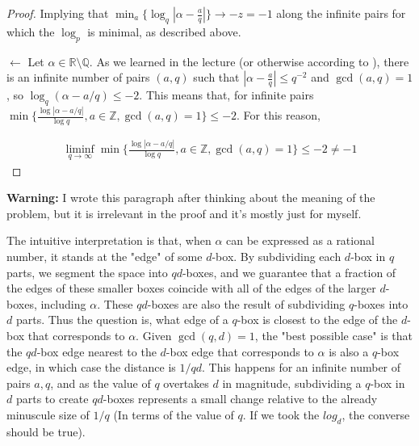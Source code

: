 \documentclass{article}
\newcommand{\R}{\mathbb{R}}
\newcommand{\Q}{\mathbb{Q}}
\newcommand{\Z}{\mathbb{Z}}
\newcommand{\abs}[1]{\left| #1 \right|}
\begin{document}
\begin{proof}
Implying that $\min_a\{ \log_q\abs{\alpha - \frac{a}{q}} \} \rightarrow -z = -1$ along the infinite pairs for which the $\log_p$ is minimal, as described above.

$\leftarrow$ Let $\alpha \in \R \setminus \Q$. As we learned in the lecture (or otherwise according to \cite[\nopp Corollary 1.2]{Everste1}), there is an infinite number of pairs $(a, q)$ such that $\abs{\alpha - \frac{a}{q}} \leq q^{-2}$ and $\gcd(a, q) = 1$, so $\log_q(\alpha - a/q) \leq -2$. This means that, for infinite pairs $\min\{\frac{\log\abs{\alpha - a/q}}{\log q}, a \in \Z, \gcd(a, q) = 1 \} \leq -2$. For this reason, 

\begin{align*}
  \liminf_{q \to \infty}\min\{\frac{\log\abs{\alpha - a/q}}{\log q}, a \in \Z, \gcd(a, q) = 1 \} \leq -2 \neq -1
\end{align*}

\end{proof}

\textbf{Warning:} I wrote this paragraph after thinking about the meaning of the problem, but it is irrelevant in the proof and it's mostly just for myself.

The intuitive interpretation is that, when $\alpha$ can be expressed as a rational number, it stands at the "edge" of some $d$-box. By subdividing each $d$-box in $q$ parts, we segment the space into $qd$-boxes, and we guarantee that a fraction of the edges of these smaller boxes coincide with all of the edges of the larger $d$-boxes, including $\alpha$. These $qd$-boxes are also the result of subdividing $q$-boxes into $d$ parts. Thus the question is, what edge of a $q$-box is closest to the edge of the $d$-box that corresponds to $\alpha$. Given $\gcd(q, d) = 1$, the "best possible case" is that the $qd$-box edge nearest to the $d$-box edge that corresponds to $\alpha$ is also a $q$-box edge, in which case the distance is $1/qd$. This happens for an infinite number of pairs $a, q$, and as the value of $q$ overtakes $d$ in magnitude, subdividing a $q$-box in $d$ parts to create $qd$-boxes represents a small change relative to the already minuscule size of $1/q$ (In terms of the value of $q$. If we took the $log_d$, the converse should be true).
\end{document}
